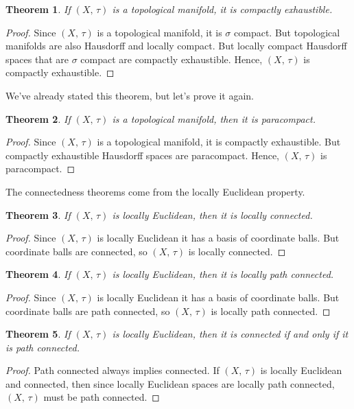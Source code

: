 \documentclass{article}
\theoremstyle{plain}
\newtheorem{theorem}{Theorem}[section]
\theoremstyle{normal}
\begin{document}
        \begin{theorem}
            If $(X,\,\tau)$ is a topological manifold, it is compactly
            exhaustible.
        \end{theorem}
        \begin{proof}
            Since $(X,\,\tau)$ is a topological manifold, it is $\sigma$
            compact. But topological manifolds are also Hausdorff and locally
            compact. But locally compact Hausdorff spaces that are
            $\sigma$ compact are compactly exhaustible. Hence,
            $(X,\,\tau)$ is compactly exhaustible.
        \end{proof}
        We've already stated this theorem, but let's prove it again.
        \begin{theorem}
            If $(X,\,\tau)$ is a topological manifold, then it is paracompact.
        \end{theorem}
        \begin{proof}
            Since $(X,\,\tau)$ is a topological manifold, it is compactly
            exhaustible. But compactly exhaustible Hausdorff spaces are
            paracompact. Hence, $(X,\,\tau)$ is paracompact.
        \end{proof}
        The connectedness theorems come from the locally Euclidean property.
        \begin{theorem}
            If $(X,\,\tau)$ is locally Euclidean, then it is locally connected.
        \end{theorem}
        \begin{proof}
            Since $(X,\,\tau)$ is locally Euclidean it has a basis of
            coordinate balls. But coordinate balls are connected, so
            $(X,\,\tau)$ is locally connected.
        \end{proof}
        \begin{theorem}
            If $(X,\,\tau)$ is locally Euclidean, then it is locally
            path connected.
        \end{theorem}
        \begin{proof}
            Since $(X,\,\tau)$ is locally Euclidean it has a basis of
            coordinate balls. But coordinate balls are path connected, so
            $(X,\,\tau)$ is locally path connected.
        \end{proof}
        \begin{theorem}
            If $(X,\,\tau)$ is locally Euclidean, then it is connected if and
            only if it is path connected.
        \end{theorem}
        \begin{proof}
            Path connected always implies connected. If $(X,\,\tau)$ is
            locally Euclidean and connected, then since locally Euclidean
            spaces are locally path connected, $(X,\,\tau)$ must be
            path connected.
        \end{proof}
\end{document}
